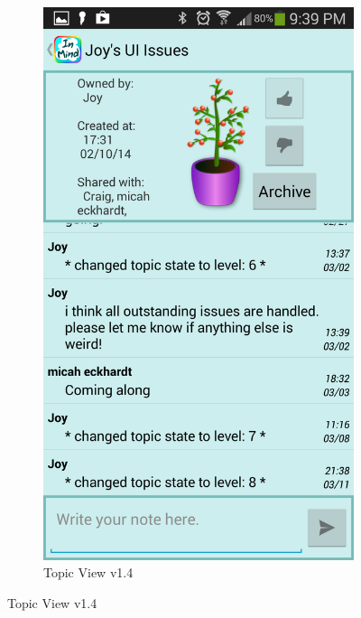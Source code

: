 \begin{figure}
\begin{subfigure}[b]{0.4\textwidth}
      \includegraphics[width=\textwidth]{plant_final.png}
       \caption{Topic View v1.4}
    \end{subfigure}
    \label{fig:topic_screens}
  \end{figure}
